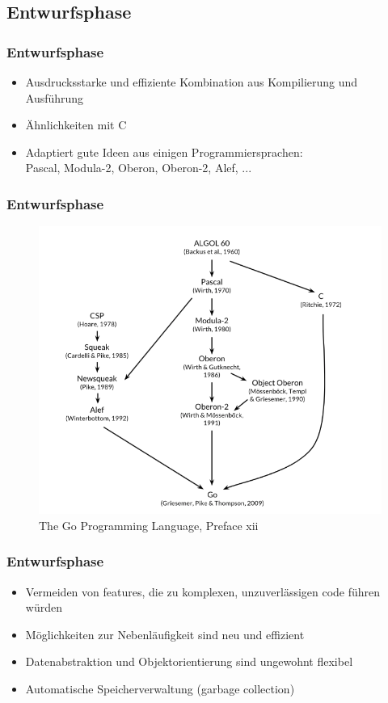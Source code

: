 \documentclass{beamer}
\begin{document}

\subsection{Entwurfsphase}
\begin{frame}
\frametitle{Entwurfsphase}

\begin{itemize}
\setlength{\itemsep}{40pt}
\item Ausdrucksstarke und effiziente Kombination aus Kompilierung und Ausf\"uhrung
\item Ähnlichkeiten mit C
\item Adaptiert gute Ideen aus einigen Programmiersprachen: \\
Pascal, Modula-2, Oberon, Oberon-2, Alef, ...
\end{itemize}

\end{frame}

\begin{frame}
\frametitle{Entwurfsphase}

\begin{figure}
\centering
\includegraphics[scale=0.45]{origin.png}
\caption{The Go Programming Language,  Preface xii}
\end{figure}

\end{frame}

\begin{frame}
\frametitle{Entwurfsphase}

\begin{itemize}
\setlength{\itemsep}{40pt}
\item Vermeiden von features, die zu komplexen, unzuverl\"assigen code führen w\"urden
\item M\"oglichkeiten zur Nebenl\"aufigkeit sind neu und effizient
\item Datenabstraktion und Objektorientierung sind ungewohnt flexibel
\item Automatische Speicherverwaltung (garbage collection)
\end{itemize}

\end{frame}
\end{document}
